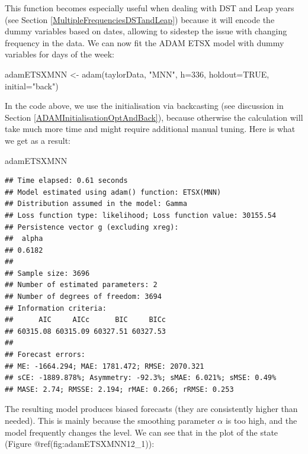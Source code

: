 \documentclass[
]{book}
\newenvironment{Shaded}{\begin{snugshade}}{\end{snugshade}}
\newcommand{\AttributeTok}[1]{\textcolor[rgb]{0.77,0.63,0.00}{#1}}
\newcommand{\ConstantTok}[1]{\textcolor[rgb]{0.00,0.00,0.00}{#1}}
\newcommand{\DecValTok}[1]{\textcolor[rgb]{0.00,0.00,0.81}{#1}}
\newcommand{\FunctionTok}[1]{\textcolor[rgb]{0.00,0.00,0.00}{#1}}
\newcommand{\NormalTok}[1]{#1}
\newcommand{\OtherTok}[1]{\textcolor[rgb]{0.56,0.35,0.01}{#1}}
\newcommand{\StringTok}[1]{\textcolor[rgb]{0.31,0.60,0.02}{#1}}
\theoremstyle{definition}
\theoremstyle{definition}
\theoremstyle{definition}
\theoremstyle{definition}
\theoremstyle{remark}
\begin{document}
This function becomes especially useful when dealing with DST and Leap years (see Section \ref{MultipleFrequenciesDSTandLeap}) because it will encode the dummy variables based on dates, allowing to sidestep the issue with changing frequency in the data. We can now fit the ADAM ETSX model with dummy variables for days of the week:

\begin{Shaded}
\begin{Highlighting}[]
\NormalTok{adamETSXMNN }\OtherTok{\textless{}{-}} \FunctionTok{adam}\NormalTok{(taylorData, }\StringTok{"MNN"}\NormalTok{, }\AttributeTok{h=}\DecValTok{336}\NormalTok{, }\AttributeTok{holdout=}\ConstantTok{TRUE}\NormalTok{,}
                    \AttributeTok{initial=}\StringTok{"back"}\NormalTok{)}
\end{Highlighting}
\end{Shaded}

In the code above, we use the initialisation via backcasting (see discussion in Section \ref{ADAMInitialisationOptAndBack}), because otherwise the calculation will take much more time and might require additional manual tuning. Here is what we get as a result:

\begin{Shaded}
\begin{Highlighting}[]
\NormalTok{adamETSXMNN}
\end{Highlighting}
\end{Shaded}

\begin{verbatim}
## Time elapsed: 0.61 seconds
## Model estimated using adam() function: ETSX(MNN)
## Distribution assumed in the model: Gamma
## Loss function type: likelihood; Loss function value: 30155.54
## Persistence vector g (excluding xreg):
##  alpha 
## 0.6182 
## 
## Sample size: 3696
## Number of estimated parameters: 2
## Number of degrees of freedom: 3694
## Information criteria:
##      AIC     AICc      BIC     BICc 
## 60315.08 60315.09 60327.51 60327.53 
## 
## Forecast errors:
## ME: -1664.294; MAE: 1781.472; RMSE: 2070.321
## sCE: -1889.878%; Asymmetry: -92.3%; sMAE: 6.021%; sMSE: 0.49%
## MASE: 2.74; RMSSE: 2.194; rMAE: 0.266; rRMSE: 0.253
\end{verbatim}

The resulting model produces biased forecasts (they are consistently higher than needed). This is mainly because the smoothing parameter \(\alpha\) is too high, and the model frequently changes the level. We can see that in the plot of the state (Figure @ref(fig:adamETSXMNN12\_1)):
\end{document}
